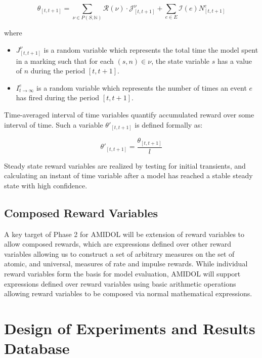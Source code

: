 \documentclass[11pt]{article}
\newcommand{\amidol}{\textsc{AMIDOL}}
\begin{document}
\[\theta_{[t,t+1]} = \sum_{\nu \in P(S, \mathbb{N})} \mathcal{R}(\nu) \cdot \mathcal{J}^{\nu}_{[t, t+1]} + \sum_{e \in E} \mathcal{I}(e)N^e_{[t,t+1]}\]

where

\begin{itemize}
\item $J^{\nu}_{[t,t+1]}$ is a random variable which represents the total time the model spent in a marking such that for each $(s, n) \in \nu$, the state variable $s$ has a value of $n$ during the period $[t, t+1]$.
\item $I^e_{t\rightarrow\infty}$ is a random variable which represents the number of times an event $e$ has fired during the period $[t, t+1]$.
\end{itemize}

Time-averaged interval of time variables quantify accumulated reward over some interval of time.  Such a variable $\theta'_{[t,t+1]}$ is defined formally as:

\[\theta'_{[t,t+1]} = \frac{\theta_{[t,t+1]}}{l}\]

Steady state reward variables are realized by testing for initial transients, and calculating an instant of time variable after a model has reached a stable steady state with high confidence.

\subsection{Composed Reward Variables}

A key target of Phase 2 for \amidol{} will be extension of reward variables to allow composed rewards, which are expressions defined over other reward variables allowing us to construct a set of arbitrary measures on the set of atomic, and universal, measures of rate and impulse rewards. While individual reward variables form the basis for model evaluation, \amidol{} will support expressions defined over reward variables using basic arithmetic operations allowing reward variables to be composed via normal mathematical expressions.

\section{Design of Experiments and Results Database}
\end{document}
